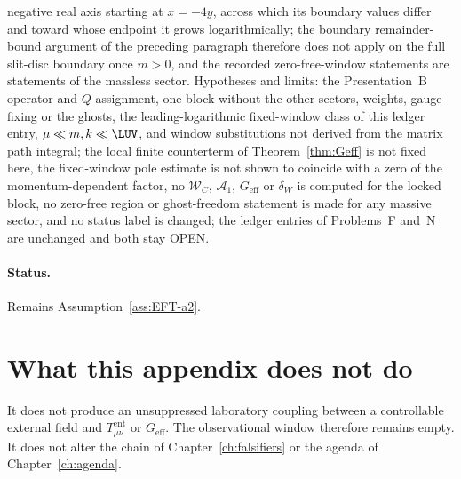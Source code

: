 negative real axis starting at \(x=-4y\), across which its boundary
values differ and toward whose endpoint it grows logarithmically;
the boundary remainder-bound argument of the preceding paragraph
therefore does not apply on the full slit-disc boundary once
\(m>0\), and the recorded zero-free-window statements are statements
of the massless sector. Hypotheses and limits: the Presentation~B
operator and \(Q\) assignment, one block without the other sectors,
weights, gauge fixing or the ghosts, the leading-logarithmic
fixed-window class of this ledger entry, \(\mu\ll m,k\ll\LUV\), and
window substitutions not derived from the matrix path integral; the
local finite counterterm of Theorem~\ref{thm:Geff} is not fixed here,
the fixed-window pole estimate is not shown to coincide with a zero
of the momentum-dependent factor, no \(\mathcal W_C\),
\(\mathcal A_1\), \(G_{\mathrm{eff}}\) or \(\delta_W\) is computed
for the locked block, no zero-free region or ghost-freedom statement
is made for any massive sector, and no status label is changed; the
ledger entries of Problems~F and~N are unchanged and both stay OPEN.

\paragraph{Status.}
Remains Assumption~\ref{ass:EFT-a2}.

\section{What this appendix does not do}
\label{sec:status-not}

It does not produce an unsuppressed laboratory coupling between a
controllable external field and \(T_{\mu\nu}^{\mathrm{ent}}\) or
\(G_{\mathrm{eff}}\). The observational window therefore remains empty.
It does not alter the chain of Chapter~\ref{ch:falsifiers} or the agenda of
Chapter~\ref{ch:agenda}.
